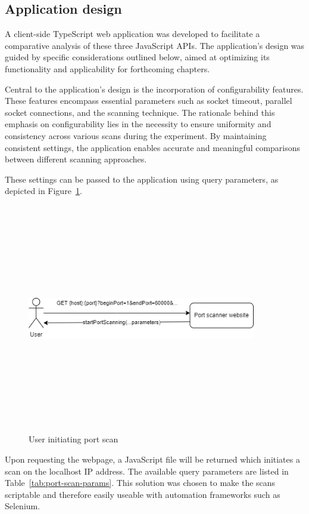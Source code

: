 \subsection{Application design}

A client-side TypeScript web application was developed to facilitate a comparative analysis of these three JavaScript APIs. The application's design was guided by specific considerations outlined below, aimed at optimizing its functionality and applicability for forthcoming chapters.

Central to the application's design is the incorporation of configurability features. These features encompass essential parameters such as socket timeout, parallel socket connections, and the scanning technique. The rationale behind this emphasis on configurability lies in the necessity to ensure uniformity and consistency across various scans during the experiment. By maintaining consistent settings, the application enables accurate and meaningful comparisons between different scanning approaches.

These settings can be passed to the application using query parameters, as depicted in Figure~\ref{fig:initiate-scan}. 

\begin{figure}[ht]
    \centering
\includegraphics[width=10cm, height=10cm, keepaspectratio]{port_scanning_techniques/img/initiate_port_scan.png}
    \caption{User initiating port scan}
    \label{fig:initiate-scan}
\end{figure}

Upon requesting the webpage, a JavaScript file will be returned which initiates a scan on the localhost IP address. The available query parameters are listed in Table~\ref{tab:port-scan-params}. This solution was chosen to make the scans scriptable and therefore easily useable with automation frameworks such as Selenium.

